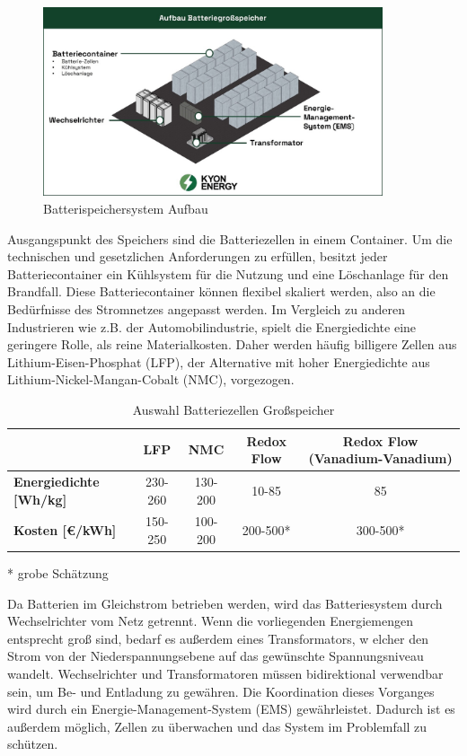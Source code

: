 \begin{figure}[h!]
    \centering
    \includegraphics[width=10cm]{Abbildungen/StandDerTechnikAbb4jpg.jpg}
    \caption{Batterispeichersystem Aufbau}\label{fig:Batterispeichersystem_Aufbau}
\end{figure}

Ausgangspunkt des Speichers sind die Batteriezellen in einem Container. 
Um die technischen und gesetzlichen Anforderungen zu erfüllen, besitzt jeder Batteriecontainer ein Kühlsystem für die Nutzung und eine Löschanlage für den Brandfall. 
Diese Batteriecontainer können flexibel skaliert werden, also an die Bedürfnisse des Stromnetzes angepasst werden. 
Im Vergleich zu anderen Industrieren wie z.B. der Automobilindustrie, spielt die Energiedichte eine geringere Rolle, als reine Materialkosten. 
Daher werden häufig billigere Zellen aus Lithium-Eisen-Phosphat (LFP), der Alternative mit hoher Energiedichte aus Lithium-Nickel-Mangan-Cobalt (NMC), vorgezogen.

\begin{table}[htbp]
    \centering
    \caption{Auswahl Batteriezellen Großspeicher\cite{poworks-comparison}}
    \label{tab:Auswahl_Batteriezellen_Großspeicher}
    \begin{tabular}{lcccc}
       \toprule
        & \textbf{LFP} & \textbf{NMC} & \textbf{Redox Flow} & \textbf{Redox Flow (Vanadium-Vanadium)} \\
        \midrule
        \textbf{Energiedichte [Wh/kg]} & 230-260 & 130-200 & 10-85 & 85 \\
        \textbf{Kosten [€/kWh]} & 150-250 & 100-200 & 200-500* & 300-500* \\
        \bottomrule
    \end{tabular}
\end{table}

* grobe Schätzung

Da Batterien im Gleichstrom betrieben werden, wird das Batteriesystem durch Wechselrichter vom Netz getrennt. 
Wenn die vorliegenden Energiemengen entsprecht groß sind, bedarf es außerdem eines Transformators, w
elcher den Strom von der Niederspannungsebene auf das gewünschte Spannungsniveau wandelt. 
Wechselrichter und Transformatoren müssen bidirektional verwendbar sein, um Be- und Entladung zu gewähren. 
Die Koordination dieses Vorganges wird durch ein Energie-Management-System (EMS) gewährleistet. 
Dadurch ist es außerdem möglich, Zellen zu überwachen und das System im Problemfall zu schützen\cite{kyon-energy}.

